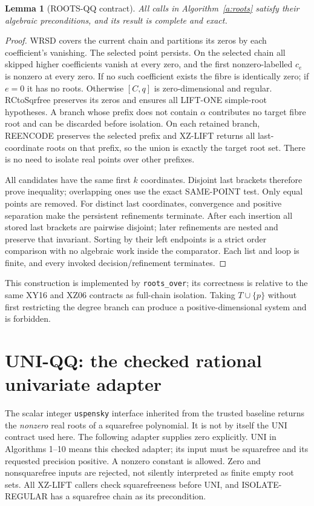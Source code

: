 \documentclass[11pt]{article}
\newtheorem{lemma}[theorem]{Lemma}
\theoremstyle{definition}
\begin{document}
\begin{lemma}[ROOTS-QQ contract]
All calls in Algorithm~\ref{a:roots} satisfy their algebraic preconditions, and
its result is complete and exact.
\end{lemma}
\begin{proof}
WRSD covers the current chain and partitions its zeros by each coefficient's
vanishing. The selected point persists. On the selected chain all skipped higher
coefficients vanish at every zero, and the first nonzero-labelled $c_e$ is
nonzero at every zero. If no such coefficient exists the fibre is identically
zero; if $e=0$ it has no roots. Otherwise $[C,q]$ is zero-dimensional and regular.
RCtoSqrfree preserves its zeros and ensures all LIFT-ONE simple-root hypotheses.
A branch whose prefix does not contain $\alpha$ contributes no target fibre
root and can be discarded before isolation. On each retained branch, REENCODE
preserves the selected prefix and XZ-LIFT returns all last-coordinate roots on
that prefix, so the union is exactly the target root set. There is no need to
isolate real points over other prefixes.

All candidates have the same first $k$ coordinates. Disjoint last brackets
therefore prove inequality; overlapping ones use the exact SAME-POINT test.
Only equal points are removed. For distinct last coordinates, convergence and
positive separation make the persistent refinements terminate. After each
insertion all stored last brackets are pairwise disjoint; later refinements are
nested and preserve that invariant. Sorting by their left endpoints is a strict
order comparison with no algebraic work inside the comparator. Each list and
loop is finite, and every invoked decision/refinement terminates.
\end{proof}
This construction is implemented by \texttt{roots\_over}; its correctness is
relative to the same XY16 and XZ06 contracts as full-chain isolation. Taking
$T\cup\{p\}$ without first restricting the degree branch can produce a
positive-dimensional system and is forbidden.

\section{UNI-QQ: the checked rational univariate adapter}
\label{s:uni}
The scalar integer \texttt{uspensky} interface inherited from the trusted
baseline returns the \emph{nonzero} real roots of a squarefree polynomial.
It is not by itself the UNI contract used here. The following adapter supplies
zero explicitly. UNI in Algorithms 1--10 means this checked adapter; its input
must be squarefree and its requested precision positive. A nonzero constant is
allowed. Zero and nonsquarefree inputs are rejected, not silently interpreted as
finite empty root sets. All XZ-LIFT callers check squarefreeness before UNI, and
ISOLATE-REGULAR has a squarefree chain as its precondition.
\end{document}
